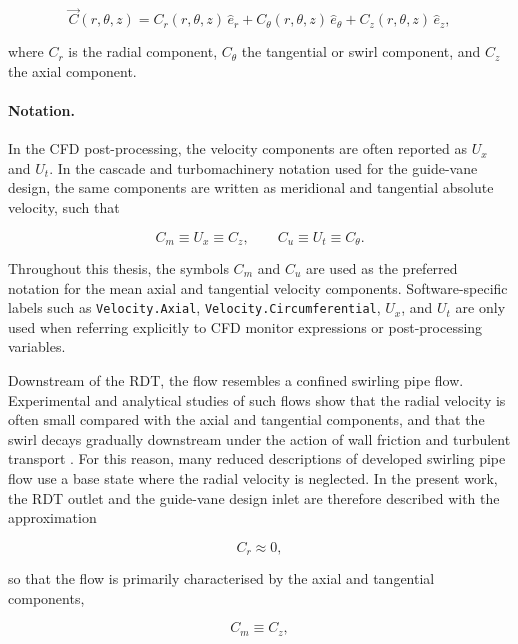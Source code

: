 \begin{equation}
\vec{C}(r,\theta,z)
=
C_r(r,\theta,z)\,\hat{e}_r
+
C_\theta(r,\theta,z)\,\hat{e}_\theta
+
C_z(r,\theta,z)\,\hat{e}_z,
\end{equation}

where \(C_r\) is the radial component, \(C_\theta\) the tangential or swirl component, and \(C_z\) the axial component.

\paragraph{Notation.}
In the CFD post-processing, the velocity components are often reported as \(U_x\) and \(U_t\). In the cascade and turbomachinery notation used for the guide-vane design, the same components are written as meridional and tangential absolute velocity, such that

\begin{equation}
C_m \equiv U_x \equiv C_z,
\qquad
C_u \equiv U_t \equiv C_\theta.
\end{equation}

Throughout this thesis, the symbols \(C_m\) and \(C_u\) are used as the preferred notation for the mean axial and tangential velocity components. Software-specific labels such as \texttt{Velocity.Axial}, \texttt{Velocity.Circumferential}, \(U_x\), and \(U_t\) are only used when referring explicitly to CFD monitor expressions or post-processing variables.

Downstream of the RDT, the flow resembles a confined swirling pipe flow. Experimental and analytical studies of such flows show that the radial velocity is often small compared with the axial and tangential components, and that the swirl decays gradually downstream under the action of wall friction and turbulent transport \cite{Kitoh1991}. For this reason, many reduced descriptions of developed swirling pipe flow use a base state where the radial velocity is neglected. In the present work, the RDT outlet and the guide-vane design inlet are therefore described with the approximation

\begin{equation}
C_r \approx 0,
\end{equation}

so that the flow is primarily characterised by the axial and tangential components,

\begin{equation}
C_m \equiv C_z,
\end{equation}

